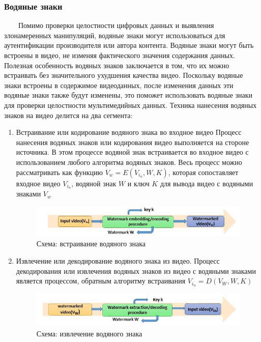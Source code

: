 \documentclass[12pt]{article}
\begin{document}
    \subsubsection{Водяные знаки}
        $\qquad$Помимо проверки целостности цифровых данных и выявления злонамеренных манипуляций, водяные знаки могут использоваться для аутентификации производителя или автора контента. Водяные знаки могут быть встроены в видео, не изменяя фактического значения содержания данных. Полезная особенность водяных знаков заключается в том, что их можно встраивать без значительного ухудшения качества видео. Поскольку водяные знаки встроены в содержимое видеоданных, после изменения данных эти водяные знаки также будут изменены, это поможет использовать водяные знаки для проверки целостности мультимедийных данных. Техника нанесения водяных знаков на видео делится на два сегмента:
        \newline
        \begin{enumerate}
            \item Встраивание или кодирование водяного знака во входное видео
            Процесс нанесения водяных знаков или кодирования видео выполняется на стороне источника. В этом процессе водяной знак встраивается во входное видео с использованием любого алгоритма водяных знаков. Весь процесс можно рассматривать как функцию $V_w = E(V_i_n,W,K)$, которая сопоставляет входное видео $V_i_n$, водяной знак $W$ и ключ $K$ для вывода видео с водяными знаками $V_w$
            \begin{figure}[h!]
            \centering
            \includegraphics[width = 300 pt] {13.jpg}
            \caption{Схема: встраивание водяного знака}
        \end{figure}
            \item  Извлечение или декодирование водяного знака из видео.
        Процесс декодирования или извлечения водяных знаков из видео с водяными знаками является процессом, обратным алгоритму встраивания $V_i_n = D(V_W,W,K)$
            \begin{figure}[h!]
            \centering
            \includegraphics[width = 300 pt] {14.jpg}
            \caption{Схема: извлечение водяного знака}
        \end{figure}
        \end{enumerate}
        \newpage
\end{document}
